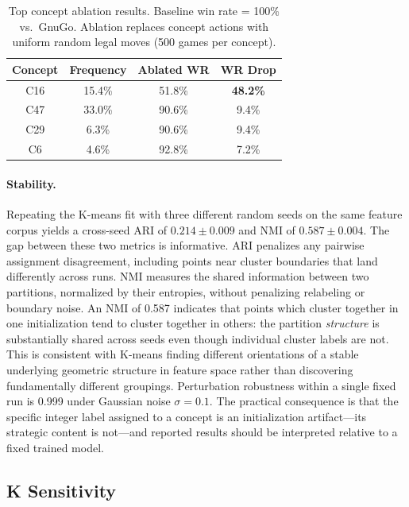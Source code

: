 \documentclass[11pt,a4paper]{article}
\begin{document}
\begin{table}[t]
\centering
\caption{Top concept ablation results. Baseline win rate = 100\% vs.\ GnuGo. Ablation replaces concept actions with uniform random legal moves (500 games per concept).}
\label{tab:ablation}
\begin{tabular}{cccc}
\toprule
\textbf{Concept} & \textbf{Frequency} & \textbf{Ablated WR} & \textbf{WR Drop} \\
\midrule
C16 & 15.4\% & 51.8\% & \textbf{48.2\%} \\
C47 & 33.0\% & 90.6\% & 9.4\% \\
C29 & 6.3\%  & 90.6\% & 9.4\% \\
C6  & 4.6\%  & 92.8\% & 7.2\% \\
\bottomrule
\end{tabular}
\end{table}

\paragraph{Stability.}
Repeating the K-means fit with three different random seeds on the same feature corpus yields a cross-seed ARI of $0.214 \pm 0.009$ and NMI of $0.587 \pm 0.004$. The gap between these two metrics is informative. ARI penalizes any pairwise assignment disagreement, including points near cluster boundaries that land differently across runs. NMI measures the shared information between two partitions, normalized by their entropies, without penalizing relabeling or boundary noise. An NMI of 0.587 indicates that points which cluster together in one initialization tend to cluster together in others: the partition \emph{structure} is substantially shared across seeds even though individual cluster labels are not. This is consistent with K-means finding different orientations of a stable underlying geometric structure in feature space rather than discovering fundamentally different groupings. Perturbation robustness within a single fixed run is 0.999 under Gaussian noise $\sigma{=}0.1$. The practical consequence is that the specific integer label assigned to a concept is an initialization artifact---its strategic content is not---and reported results should be interpreted relative to a fixed trained model.

\subsection{K Sensitivity}
\label{sec:k_sensitivity}
\end{document}
